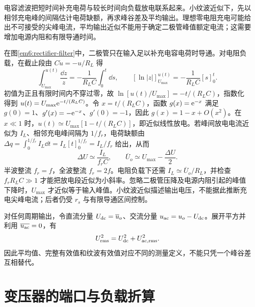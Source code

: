 电容滤波把短时间补充电荷与较长时间向负载放电联系起来。小纹波近似下，先以相邻充电峰的间隔估计电荷缺额，再求峰谷差及平均输出。理想零电阻充电可能给出不可接受的尖峰电流，平均输出近似不能用于确定二极管峰值额定电流；这需要增加电源内阻和有限导通时间。


在图\ref{em6:rectifier-filter}中，二极管只在输入足以补充电容电荷时导通。对电阻负载，在截止段由 $C\dot u=-u/R_L$ 得
\[
 \int_{U_{\max}}^{u(t)}\frac{\dd z}{z}
 =-\frac1{R_LC}\int_0^t\dd s,\qquad
 [\ln|z|]_{U_{\max}}^{u(t)}=-\frac1{R_LC}[s]_0^t.
\]
初值为正且有限时间内不穿过零，故 $\ln[u(t)/U_{\max}]=-t/(R_LC)$，指数化得到 $u(t)=U_{\max}\mathrm e^{-t/(R_LC)}$。令 $x=t/(R_LC)$，函数 $g(x)=\mathrm e^{-x}$ 满足 $g(0)=1$、$g'(x)=-\mathrm e^{-x}$、$g'(0)=-1$，因此 $g(x)=1-x+O(x^2)$。在 $x\ll1$ 时，$u(t)\simeq U_{\max}[1-t/(R_LC)]$，即近似线性放电。若峰间放电电流近似为 $I_L$、相邻充电峰间隔为 $1/f_r$，电荷缺额由
$\Delta q=\int_0^{1/f_r}I_L\dd t=I_L[t]_0^{1/f_r}=I_L/f_r$ 给出，从而
\[\Delta U\simeq\frac{I_L}{f_rC},\qquad
\overline U_o\simeq U_{\max}-\frac{\Delta U}{2}.\]
半波整流 $f_r=f$，全波整流 $f_r=2f$。电阻负载下还需 $I_L\simeq\overline U_o/R_L$，并检查 $f_rR_LC\gg1$ 才能把放电段近似为小斜率。忽略二极管压降及电源内阻引起的峰值下降时，$U_{\max}$ 才近似等于输入峰值。小纹波近似描述输出电压，不能据此推断充电尖峰电流；后者仍受 $r_s$ 与有限导通区间控制。

对任何周期输出，令直流分量 $U_{\rm dc}=\overline u_o$、交流分量 $u_{\rm ac}=u_o-U_{\rm dc}$。展开平方并利用 $\overline{u_{\rm ac}}=0$，有
\[U_{\rm rms}^2=U_{\rm dc}^2+U_{\rm ac,rms}^2.\]
因此平均值、完整有效值和纹波有效值对应不同的测量定义，不能只凭一个峰谷差互相替代。


\section{变压器的端口与负载折算}

